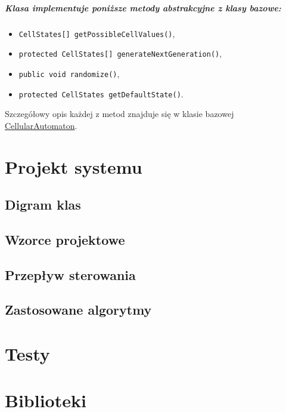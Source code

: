 \documentclass{report}
\begin{document}
\paragraph{Klasa implementuje poniższe metody abstrakcyjne z klasy bazowe:}
\begin{itemize}
    \item \texttt{CellStates[] getPossibleCellValues()},
    \item \texttt{protected CellStates[] generateNextGeneration()},
    \item \texttt{public void randomize()},
    \item \texttt{protected CellStates getDefaultState()}.
\end{itemize}
Szczegółowy opis każdej z metod znajduje się w klasie bazowej \hyperref[subsec:cellularAutomaton]{CellularAutomaton}.

\chapter{Projekt systemu}

\section{Digram klas}

\section{Wzorce projektowe}

\section{Przepływ sterowania}


\section{Zastosowane algorytmy}

\chapter{Testy}

\chapter{Biblioteki}
\end{document}
